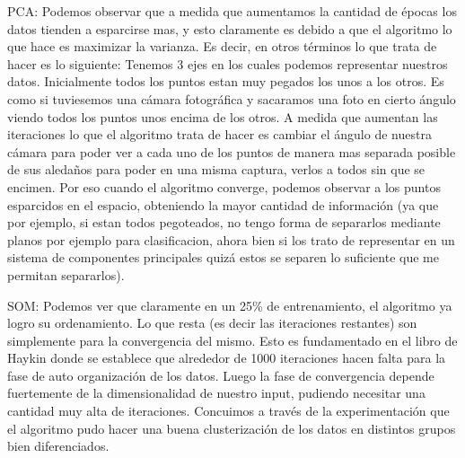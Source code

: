 PCA: Podemos observar que a medida que aumentamos la cantidad de épocas los datos tienden a esparcirse mas, y esto claramente es debido a que el algoritmo lo que hace es maximizar la varianza. Es decir, en otros términos lo que trata de hacer es lo siguiente:
Tenemos 3 ejes en los cuales podemos representar nuestros datos. Inicialmente todos los puntos estan muy pegados los unos a los otros. Es como si tuviesemos una cámara fotográfica y sacaramos una foto en cierto ángulo viendo todos los puntos unos encima de los otros. A medida que aumentan las iteraciones lo que el algoritmo trata de hacer es cambiar el ángulo de nuestra cámara para poder ver a cada uno de los puntos de manera mas separada posible de sus aledaños para poder en una misma captura, verlos a todos sin que se encimen. Por eso cuando el algoritmo converge, podemos observar a los puntos esparcidos en el espacio, obteniendo la mayor cantidad de información (ya que por ejemplo, si estan todos pegoteados, no tengo forma de separarlos mediante planos por ejemplo para clasificacion, ahora bien si los trato de representar en un sistema de componentes principales quizá estos se separen lo suficiente que me permitan separarlos).

SOM: Podemos ver que claramente en un 25\% de entrenamiento, el algoritmo ya logro su ordenamiento. Lo que resta (es decir las iteraciones restantes) son simplemente para la convergencia del mismo. Esto es fundamentado en el libro de Haykin donde se establece que alrededor de 1000 iteraciones hacen falta para la fase de auto organización de los datos. Luego la fase de convergencia depende fuertemente de la dimensionalidad de nuestro input, pudiendo necesitar una cantidad muy alta de iteraciones. Concuimos a través de la experimentación que el algoritmo pudo hacer una buena clusterización de los datos en distintos grupos bien diferenciados.